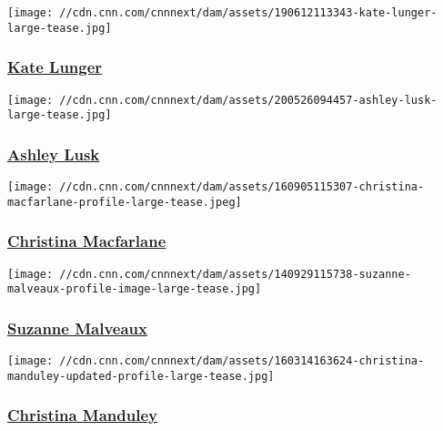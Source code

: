 \href{/profiles/kate-lunger}{}

\texttt{[image: //cdn.cnn.com/cnnnext/dam/assets/190612113343-kate-lunger-large-tease.jpg]}

\hypertarget{kate-lunger}{%
\subsubsection{\texorpdfstring{\href{/profiles/kate-lunger}{Kate
Lunger}}{Kate Lunger}}\label{kate-lunger}}

\href{/profiles/ashley-lusk}{}

\texttt{[image: //cdn.cnn.com/cnnnext/dam/assets/200526094457-ashley-lusk-large-tease.jpg]}

\hypertarget{ashley-lusk}{%
\subsubsection{\texorpdfstring{\href{/profiles/ashley-lusk}{Ashley
Lusk}}{Ashley Lusk}}\label{ashley-lusk}}

\href{/profiles/christina-macfarlane}{}

\texttt{[image: //cdn.cnn.com/cnnnext/dam/assets/160905115307-christina-macfarlane-profile-large-tease.jpeg]}

\hypertarget{christina-macfarlane}{%
\subsubsection{\texorpdfstring{\href{/profiles/christina-macfarlane}{Christina
Macfarlane}}{Christina Macfarlane}}\label{christina-macfarlane}}

\href{/profiles/suzanne-malveaux-profile}{}

\texttt{[image: //cdn.cnn.com/cnnnext/dam/assets/140929115738-suzanne-malveaux-profile-image-large-tease.jpg]}

\hypertarget{suzanne-malveaux}{%
\subsubsection{\texorpdfstring{\href{/profiles/suzanne-malveaux-profile}{Suzanne
Malveaux}}{Suzanne Malveaux}}\label{suzanne-malveaux}}

\href{/profiles/christina-manduley-profile}{}

\texttt{[image: //cdn.cnn.com/cnnnext/dam/assets/160314163624-christina-manduley-updated-profile-large-tease.jpg]}

\hypertarget{christina-manduley}{%
\subsubsection{\texorpdfstring{\href{/profiles/christina-manduley-profile}{Christina
Manduley}}{Christina Manduley}}\label{christina-manduley}}

